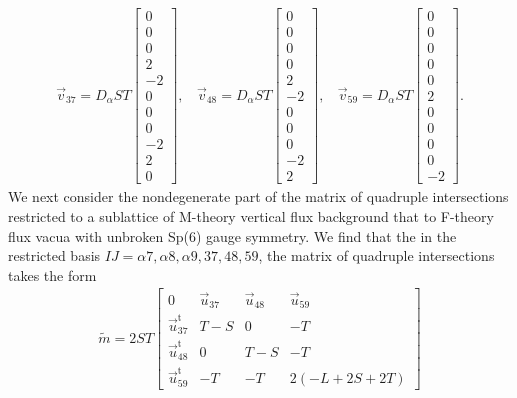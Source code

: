 \documentclass[11pt,oneside,english]{article}
\numberwithin{equation}{section}
\theoremstyle{definition}
\begin{document}
	\begin{align}
		\vec v_{37} = D_\alpha S T \begin{bmatrix} 0\\0\\0\\2\\-2\\0\\0\\0\\-2\\2\\0\end{bmatrix},~~~~\vec v_{48} = D_\alpha S T \begin{bmatrix} 0\\0\\0\\0\\2\\-2\\0\\0\\0\\-2\\2\end{bmatrix},~~~~ \vec v_{59} = D_\alpha S T \begin{bmatrix} 0\\0\\0\\0\\0\\2\\0\\0\\0\\0\\-2\end{bmatrix}.
	\end{align}
We next consider the nondegenerate part of the matrix of quadruple intersections restricted to a sublattice of M-theory vertical flux background that to F-theory flux vacua with unbroken Sp(6) gauge symmetry. We find that the in the restricted basis $IJ = \alpha 7, \alpha 8, \alpha 9,37,48,59$, the matrix of quadruple intersections takes the form
	\begin{align}
	\tilde m =	
			2 S T \begin{bmatrix}0  &\vec u_{37} & \vec u_{48} & \vec u_{59} \\
		\vec u_{37}^{\mathrm t} &T-S & 0&-T \\
		\vec u_{48}^{\mathrm t} &0&T-S&-T \\
		\vec u_{59}^{\mathrm t} &-T&-T& 2 (-L + 2 S + 2 T)
		\end{bmatrix}
	\end{align}
\end{document}
